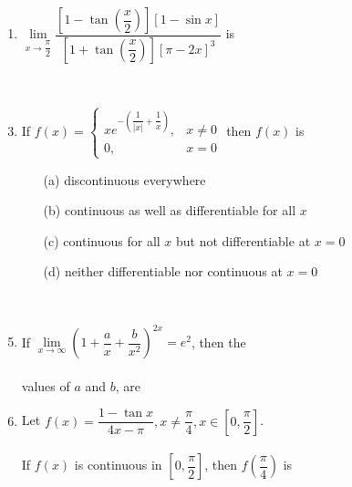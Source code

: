 \begin{enumerate}[label=\arabic*.,ref=\thesubsection.\theenumi]
\item$\lim\limits_{x \to \dfrac{\pi}{2}}\dfrac{\left[1-\tan\left(\dfrac{x}{2}\right)\right][1-\sin x]}{\left[1+\tan\left(\dfrac{x}{2}\right)\right][\pi-2x]^3}$ is
\begin{itemize}
\end{itemize} \item[~]

\item If $f(x)=\begin{cases}
xe^{-\left(\dfrac{1}{|x|}+\dfrac{1}{x}\right)}, &\text{$x\neq 0$}\\
0, &\text{$x=0$}
\end{cases}$ then $f(x)$ is
\begin{itemize}
\item[(a)] discontinuous everywhere
\item[(b)] continuous as well as differentiable for all $x$
\item[(c)] continuous for all $x$ but not differentiable at $x=0$
\item[(d)] neither differentiable nor continuous at $x=0$
\end{itemize}\item[~]

\item If $\lim\limits_{x \to \infty}\left(1+\dfrac{a}{x}+\dfrac{b}{x^2}\right)^{2x}=e^2$, then the \\ \\values of $a$ and $b$, are
\begin{itemize}
\end{itemize}

\item Let $f(x)=\dfrac{1-\tan x}{4x-\pi}, x\neq \dfrac{\pi}{4}, x\in\left[0,\dfrac{\pi}{2}\right]$. \\ \\If $f(x)$ is continuous in $\left[0,\dfrac{\pi}{2}\right]$, then $f\left(\dfrac{\pi}{4}\right)$ is
\begin{itemize}
\end{itemize}\item[~]


\end{enumerate}
